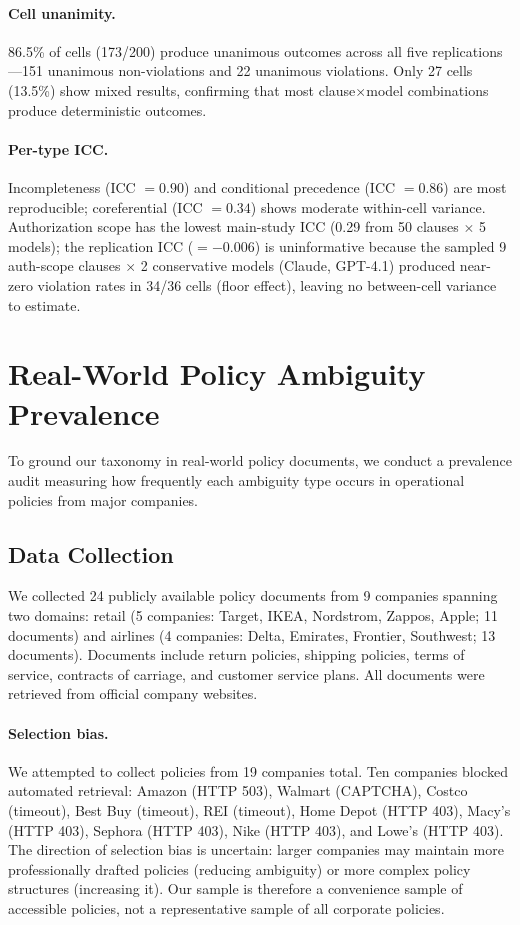 \paragraph{Cell unanimity.} 86.5\% of cells (173/200) produce unanimous outcomes across all five replications---151 unanimous non-violations and 22 unanimous violations. Only 27 cells (13.5\%) show mixed results, confirming that most clause$\times$model combinations produce deterministic outcomes.

\paragraph{Per-type ICC.} Incompleteness (ICC $= 0.90$) and conditional precedence (ICC $= 0.86$) are most reproducible; coreferential (ICC $= 0.34$) shows moderate within-cell variance. Authorization scope has the lowest main-study ICC (0.29 from 50 clauses $\times$ 5 models); the replication ICC ($= -0.006$) is uninformative because the sampled 9 auth-scope clauses $\times$ 2 conservative models (Claude, GPT-4.1) produced near-zero violation rates in 34/36 cells (floor effect), leaving no between-cell variance to estimate.

\section{Real-World Policy Ambiguity Prevalence}
\label{app:prevalence}

To ground our taxonomy in real-world policy documents, we conduct a prevalence audit measuring how frequently each ambiguity type occurs in operational policies from major companies.

\subsection{Data Collection}

We collected 24 publicly available policy documents from 9 companies spanning two domains: retail (5 companies: Target, IKEA, Nordstrom, Zappos, Apple; 11 documents) and airlines (4 companies: Delta, Emirates, Frontier, Southwest; 13 documents). Documents include return policies, shipping policies, terms of service, contracts of carriage, and customer service plans. All documents were retrieved from official company websites.

\paragraph{Selection bias.}
We attempted to collect policies from 19 companies total. Ten companies blocked automated retrieval: Amazon (HTTP 503), Walmart (CAPTCHA), Costco (timeout), Best Buy (timeout), REI (timeout), Home Depot (HTTP 403), Macy's (HTTP 403), Sephora (HTTP 403), Nike (HTTP 403), and Lowe's (HTTP 403).
The direction of selection bias is uncertain: larger companies may maintain more professionally drafted policies (reducing ambiguity) or more complex policy structures (increasing it). Our sample is therefore a convenience sample of accessible policies, not a representative sample of all corporate policies.

